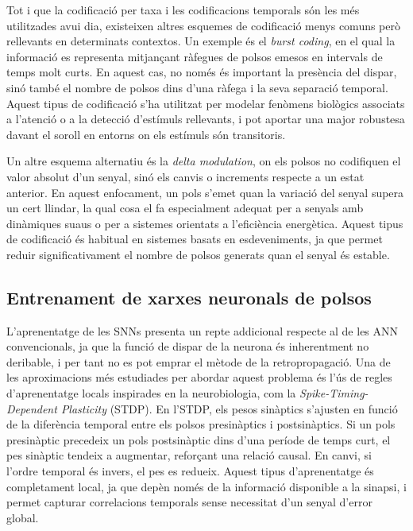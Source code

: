 \documentclass[a4paper,11pt, titlepage, twoside]{article}
\begin{document}
Tot i que la codificació per taxa i les codificacions temporals són les més utilitzades avui dia, existeixen altres esquemes de codificació menys comuns però rellevants en determinats contextos. Un exemple és el \textit{burst coding}, en el qual la informació es representa mitjançant ràfegues de polsos emesos en intervals de temps molt curts. En aquest cas, no només és important la presència del dispar, sinó també el nombre de polsos dins d'una ràfega i la seva separació temporal. Aquest tipus de codificació s'ha utilitzat per modelar fenòmens biològics associats a l'atenció o a la detecció d'estímuls rellevants, i pot aportar una major robustesa davant el soroll en entorns on els estímuls són transitoris.

Un altre esquema alternatiu és la \textit{delta modulation}, on els polsos no codifiquen el valor absolut d'un senyal, sinó els canvis o increments respecte a un estat anterior. En aquest enfocament, un pols s'emet quan la variació del senyal supera un cert llindar, la qual cosa el fa especialment adequat per a senyals amb dinàmiques suaus o per a sistemes orientats a l'eficiència energètica. Aquest tipus de codificació és habitual en sistemes basats en esdeveniments, ja que permet reduir significativament el nombre de polsos generats quan el senyal és estable.

\subsection{Entrenament de xarxes neuronals de polsos}

L'aprenentatge de les SNNs presenta un repte addicional respecte al de les ANN convencionals, ja que la funció de dispar de la neurona és inherentment no deribable, i per tant no es pot emprar el mètode de la retropropagació. Una de les aproximacions més estudiades per abordar aquest problema és l'ús de regles d'aprenentatge locals inspirades en la neurobiologia, com la \textit{Spike-Timing-Dependent Plasticity} (STDP). En l'STDP, els pesos sinàptics s'ajusten en funció de la diferència temporal entre els polsos presinàptics i postsinàptics. Si un pols presinàptic precedeix un pols postsinàptic dins d'una període de temps curt, el pes sinàptic tendeix a augmentar, reforçant una relació causal. En canvi, si l'ordre temporal és invers, el pes es redueix. Aquest tipus d'aprenentatge és completament local, ja que depèn només de la informació disponible a la sinapsi, i permet capturar correlacions temporals sense necessitat d'un senyal d'error global.
\end{document}
